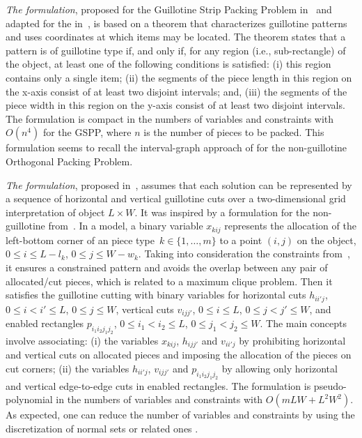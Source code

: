 \emph{The {\modelBCE} formulation}, proposed for the Guillotine Strip Packing Problem in~\citet{messaoud:2008} and adapted for the {\myproblem} in~\citet{martin:2020}, is based on a theorem that characterizes guillotine patterns and uses coordinates at which items may be located.
The theorem states that a pattern is of guillotine type if, and only if, for any region (i.e., sub-rectangle) of the object, at least one of the following conditions is satisfied:
(i) this region contains only a single item;
(ii) the segments of the piece length in this region on the x-axis consist of at least two disjoint intervals;
and, (iii) the segments of the piece width in this region on the y-axis consist of at least two disjoint intervals.
The formulation is compact in the numbers of variables and constraints with \(O(n^4)\) for the GSPP, where \(n\) is the number of pieces to be packed.
This formulation seems to recall the interval-graph approach of \citet{fekete:1997} for the non-guillotine Orthogonal Packing Problem.

\emph{The {\modelGrid} formulation}, proposed in~\citet{martin:2020}, assumes that each solution can be represented by a sequence of horizontal and vertical guillotine cuts over a two-dimensional grid interpretation of object \(L \times W\).
It was inspired by a formulation for the non-guillotine {\myproblem} from~\citet{beasley:1985:nonguillotine}.
In a {\modelGrid} model, a binary variable \(x_{kij}\) represents the allocation of the left-bottom corner of an piece type~\(k \in \{1,\ldots,m\}\) to a point \((i,j)\) on the object, \(0 \leq i \leq L-l_k\), \(0 \leq j \leq W-w_k\).
Taking into consideration the constraints from~\citet{beasley:1985:nonguillotine}, it ensures a constrained pattern and avoids the overlap between any pair of allocated/cut pieces, which is related to a maximum clique problem.
Then it satisfies the guillotine cutting with binary variables for horizontal cuts \(h_{ii\prime j}\), \(0 \leq i < i\prime \leq L\), \(0 \leq j \leq W\), vertical cuts \(v_{ijj\prime}\), \(0 \leq i \leq L\), \(0 \leq j < j\prime \leq W\), and enabled rectangles \(p_{i_1 i_2 j_1 j_2}\), \(0 \leq i_1 < i_2 \leq L\), \(0 \leq j_1 < j_2 \leq W\).
The main concepts involve associating:
(i) the variables \(x_{kij}\), \(h_{ijj\prime}\) and \(v_{ii\prime j}\) by prohibiting horizontal and vertical cuts on allocated pieces and imposing the allocation of the pieces on cut corners;
(ii) the variables \(h_{ii\prime j}\), \(v_{ijj\prime}\) and \(p_{i_1 i_2 j_1 j_2}\) by allowing only horizontal and vertical edge-to-edge cuts in enabled rectangles.
The formulation is pseudo-polynomial in the numbers of variables and constraints with \(O(mLW+L^2W^2)\).
As expected, one can reduce the number of variables and constraints by using the discretization of normal sets or related ones \citet{herz:1972,cw:1977}.

